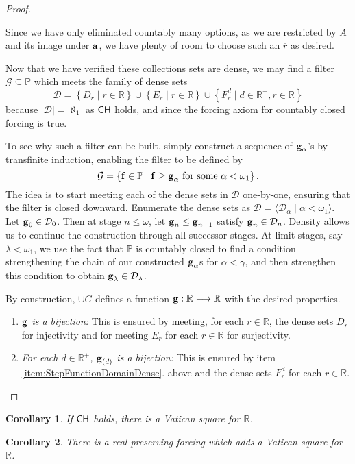 \documentclass[11pt]{amsart}
\newtheorem{corollary}{Corollary}
\theoremstyle{definition}
\theoremstyle{remark}
\renewcommand{\P}{\mathbb{P}}
\newcommand{\R}{\mathbb{R}}
\newcommand{\CH}{\textup{\textsf{CH}}}
\newcommand{\st}{\; | \;}
\newcommand{\set}[2]{\left\{#1\st #2 \right\}}
\newcommand{\seq}[2]{\langle #1 \st #2 \rangle}
\newcommand{\To}{\longrightarrow}
\renewcommand{\a}{\textup{\textbf{a}}}
\newcommand{\g}{\textup{\textbf{g}}}
\newcommand{\f}{\textup{\textbf{f}}}
\renewcommand{\r}{\overline r}
\begin{document}
\begin{proof}
\begin{enumerate}
Since we have only eliminated countably many options, as we are restricted by $A$ and its image under $\a$, we have plenty of room to choose such an $\r$ as desired.\\
\end{enumerate}

Now that we have verified these collections sets are dense, we may find a filter $\mathcal G\subseteq \P$ which meets the family of dense sets $$\mathcal D = \set{D_r}{r\in \R} \cup \set{E_r}{r \in \R} \cup \set{F^d_r}{d \in \R^+, r \in \R}$$ because $|\mathcal D|=\aleph_1$ as $\CH$ holds, and since the forcing axiom for countably closed forcing is true. 

To see why such a filter can be built, simply construct a sequence of $\g_\alpha$'s by transfinite induction, enabling the filter to be defined by 
	$$\mathcal G=\set{\f \in \P}{\f \geq \g_\alpha \text{ for some } \alpha<\omega_1}.$$ 
The idea is to start meeting each of the dense sets in $\mathcal D$ one-by-one, ensuring that the filter is closed downward. Enumerate the dense sets as $\mathcal D = \seq{\mathcal D_\alpha}{\alpha<\omega_1}$. Let $\g_0 \in \mathcal D_0$. Then at stage $n \leq \omega$, let $\g_n \leq \g_{n-1}$ satisfy $\g_n \in \mathcal D_n$. Density allows us to continue the construction through all successor stages. At limit stages, say $\lambda <\omega_1$, we use the fact that $\P$ is countably closed to find a condition strengthening the chain of our constructed $\g_\alpha$s for $\alpha<\gamma$, and then strengthen this condition to obtain $\g_\lambda \in \mathcal D_\lambda$.

By construction, $\cup G$ defines a function $\g: \R \To \R$ with the desired properties. \begin{enumerate}
	\item \emph{$\g$ is a bijection:} This is ensured by meeting, for each $r \in \R$, the dense sets $D_r$ for injectivity and for meeting $E_r$ for each $r \in \R$ for surjectivity.\\
	\item \emph{For each $d \in \R^+$, $\g_{(d)}$ is a bijection:} This is ensured by item \ref{item:StepFunctionDomainDense}. above and the dense sets $F^d_r$ for each $r \in \R$. \qedhere
\end{enumerate}
\end{proof}
		
\begin{corollary} If $\CH$ holds, there is a Vatican square for $\R$. \end{corollary}
\begin{corollary} There is a real-preserving forcing which adds a Vatican square for $\R$. \end{corollary}
\end{document}

